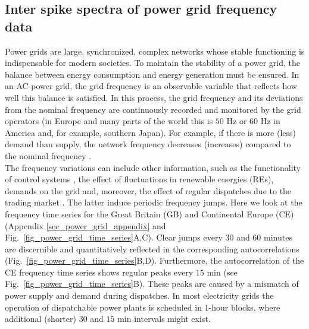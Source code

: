 \documentclass[entropy,article,submit,pdftex,moreauthors]{Definitions/mdpi}
\begin{document}
\subsection{Inter spike spectra of power grid frequency data}

Power grids are large, synchronized, complex networks whose stable functioning is indispensable for modern societies.
To maintain the stability of a power grid, the balance between energy consumption and energy generation must be ensured. 
In an AC-power grid, the grid frequency is an observable variable that reflects how well this balance is satisfied. 
In this process, the grid frequency and its deviations from the nominal frequency are continuously recorded and monitored by 
the grid operators (in Europe and many parts of the world this is $50$ \si{Hz} or $60$ \si{Hz} in America and, for example, southern Japan).
For example, if there is more (less) demand than supply, the network frequency decreases (increases) compared to the nominal frequency \cite{kundur1994power}.
\\
The frequency variations can include other information, such as the functionality of control systems \cite{gorjao2020data}, the effect of fluctuations in
renewable energies (REs), demands on the grid \cite{anvari2020stochastic} and, moreover, the effect of regular dispatches due to the trading market 
\cite{meyer2020identifying}. The latter induce periodic frequency jumps. Here we look at the frequency time series for the Great Britain (GB) and Continental Europe 
(CE) (Appendix \ref{sec_power_grid_appendix} and Fig.~\ref{fig_power_grid_time_series}A,C). Clear jumps every 30 and 60 minutes are discernible and quantitatively reflected in the corresponding 
autocorrelations (Fig.~\ref{fig_power_grid_time_series}B,D). Furthermore, the autocorrelation of the CE frequency time series shows regular peaks every $15$ \si{min} 
(see Fig.~\ref{fig_power_grid_time_series}B). These peaks are caused by a mismatch of power supply and demand \cite{weissbach2009high} during dispatches. 
In most electricity grids the operation of dispatchable power plants is scheduled in 1-hour blocks, where additional (shorter) $30$ and $15$ \si{min} intervals
might exist.\\
\end{document}

